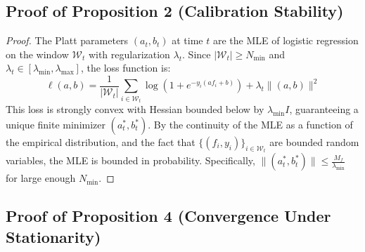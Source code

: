 \documentclass[12pt,a4paper]{article}
\begin{document}
\subsection{Proof of Proposition 2 (Calibration Stability)}

\begin{proof}
The Platt parameters $(a_t, b_t)$ at time $t$ are the MLE of logistic regression on the window $\mathcal{W}_t$ with regularization $\lambda_t$. Since $|\mathcal{W}_t| \geq N_{\min}$ and $\lambda_t \in [\lambda_{\min}, \lambda_{\max}]$, the loss function is:
\begin{equation}
\ell(a,b) = \frac{1}{|\mathcal{W}_t|} \sum_{i \in \mathcal{W}_t} \log(1 + e^{-y_i (a f_i + b)}) + \lambda_t \|(a,b)\|^2
\end{equation}
This loss is strongly convex with Hessian bounded below by $\lambda_{\min} I$, guaranteeing a unique finite minimizer $(a_t^*, b_t^*)$. By the continuity of the MLE as a function of the empirical distribution, and the fact that $\{(f_i, y_i)\}_{i \in \mathcal{W}_t}$ are bounded random variables, the MLE is bounded in probability. Specifically, $\|(a_t^*, b_t^*)\| \leq \frac{M_f}{\lambda_{\min}}$ for large enough $N_{\min}$.
\end{proof}

\subsection{Proof of Proposition 4 (Convergence Under Stationarity)}
\end{document}
